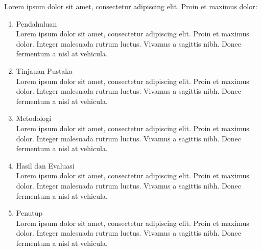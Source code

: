 Lorem ipsum dolor sit amet, consectetur adipiscing elit. Proin et maximus dolor: 
\begin{enumerate}[label=Bab \arabic*,itemindent=*]
	\item Pendahuluan\\
	Lorem ipsum dolor sit amet, consectetur adipiscing elit. Proin et maximus dolor. Integer malesuada rutrum luctus. Vivamus a sagittis nibh. Donec fermentum a nisl at vehicula. 
	\item Tinjauan Pustaka\\
	Lorem ipsum dolor sit amet, consectetur adipiscing elit. Proin et maximus dolor. Integer malesuada rutrum luctus. Vivamus a sagittis nibh. Donec fermentum a nisl at vehicula. 
    \item Metodologi\\
    Lorem ipsum dolor sit amet, consectetur adipiscing elit. Proin et maximus dolor. Integer malesuada rutrum luctus. Vivamus a sagittis nibh. Donec fermentum a nisl at vehicula. 
    \item Hasil dan Evaluasi\\
    Lorem ipsum dolor sit amet, consectetur adipiscing elit. Proin et maximus dolor. Integer malesuada rutrum luctus. Vivamus a sagittis nibh. Donec fermentum a nisl at vehicula. 
    \item Penutup\\
    Lorem ipsum dolor sit amet, consectetur adipiscing elit. Proin et maximus dolor. Integer malesuada rutrum luctus. Vivamus a sagittis nibh. Donec fermentum a nisl at vehicula. 
\end{enumerate}
